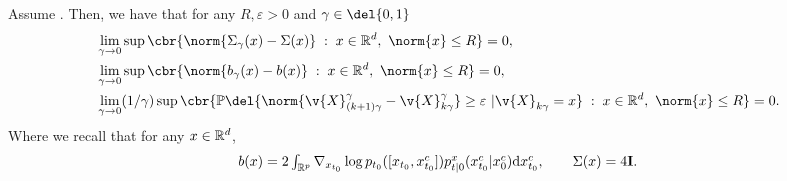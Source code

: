 \begin{lemma} \label{lemma:limit_coeff} Assume \textup{}.
	Then, we have that for any $R, \varepsilon > 0$ and $\gamma \in \del{0,1}$ \begin{align} \label{eq:zero_limit} & \lim_{\gamma \to 0} \sup \cbr{\norm{\Sigma_\gamma(x) - \Sigma(x)} \; : \; x \in \R^d, \ \norm{x} \leq R} = 0 , \\ &\lim_{\gamma \to 0} \sup \cbr{\norm{b_\gamma(x) - b(x)} \; : \; x \in \R^d, \ \norm{x} \leq R} = 0 , \\ &\lim_{\gamma \to 0} (1/\gamma) \sup \cbr{\mathbb{P} \del{\norm{\v{X}_{(k+1)\gamma}^\gamma - \v{X}_{k \gamma}^\gamma}\geq \varepsilon \ | \v{X}_{k \gamma} = x} \; : \; x \in \R^d, \ \norm{x} \leq R} = 0 .
	\end{align}
	Where we recall that for any $x \in \mathbb{R}^d$, \begin{equation} \label{eq:b_definition} \textstyle b(x) = 2\int_{\R^p} \nabla_{x_{t_0}} \log p_{t_0}([x_{t_0}, x_{t_0}^c]) p_{t|0}^x(x_{t_0}^c|x_0^c) \mathrm{d} x_{t_0}^c , \qquad \Sigma(x) = 4 \m{I} .
	\end{equation}
\end{lemma}


